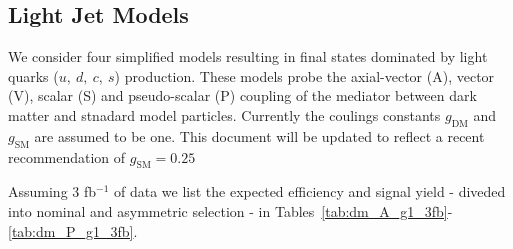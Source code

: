 \subsection{Light Jet Models}


We consider four simplified models resulting in final states dominated by light quarks ($u,~d,~c,~s$) production. These models probe the axial-vector (A), vector (V), scalar (S) and pseudo-scalar (P) coupling of the mediator between dark matter and stnadard model particles. Currently the coulings constants $g_\textrm{DM}$ and $g_\textrm{SM}$ are assumed to be one. This document will be updated to reflect a recent recommendation of $g_\textrm{SM}=0.25$

Assuming 3 fb$^{-1}$ of data we list the expected efficiency and signal yield - diveded into nominal and asymmetric selection - in Tables~\ref{tab:dm_A_g1_3fb}-\ref{tab:dm_P_g1_3fb}.

